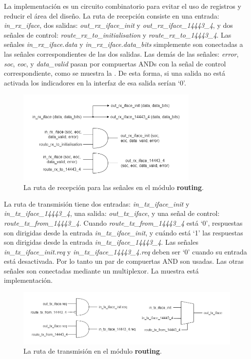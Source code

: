 \documentclass[a4paper, twoside, 11pt]{report}
\begin{document}
La implementación es un circuito combinatorio para evitar el uso de registros y reducir el área del diseño. La ruta de recepción consiste en una entrada: \textit{in\_rx\_iface}, dos salidas: \textit{out\_rx\_iface\_init} y \textit{out\_rx\_iface\_14443\_4}, y dos señales de control: \textit{route\_rx\_to\_initialisation} y \textit{route\_rx\_to\_14443\_4}. Las señales \textit{in\_rx\_iface.data} y \textit{in\_rx\_iface.data\_bits} simplemente son conectadas a las señales correspondientes de las dos salidas. Las demás de las señales: \textit{error}, \textit{soc}, \textit{eoc}, y \textit{data\_valid} pasan por compuertas ANDs con la señal de control correspondiente, como se muestra la . De esta forma, si una salida no está activada los indicadores en la interfaz de esa salida serían ‘0’.

\begin{figure}[htb]
  \centering
  \includegraphics[width=0.8\textwidth]{./img/routing_rx.drawio}
  \caption{La ruta de recepción para las señales en el módulo \textbf{routing}.}
  \label{fig:routing_rx}
\end{figure}

La ruta de transmisión tiene dos entradas: \textit{in\_tx\_iface\_init} y \textit{in\_tx\_iface\_14443\_4}, una salida: \textit{out\_tx\_iface}, y una señal de control: \textit{route\_tx\_from\_14443\_4}. Cuando \textit{route\_tx\_from\_14443\_4} está ‘0’, respuestas son dirigidas desde la entrada \textit{in\_tx\_iface\_init}, y cuándo está ‘1’ las respuestas son dirigidas desde la entrada \textit{in\_tx\_iface\_14443\_4}. Las señales \textit{in\_tx\_iface\_init.req} y \textit{in\_tx\_iface\_14443\_4.req} deben ser ‘0’ cuando su entrada está desactivada. Por lo tanto un par de compuertas AND son usadas. Las otras señales son conectadas mediante un multiplexor. La  muestra está implementación.

\begin{figure}[htb]
  \centering
  \includegraphics[width=1.0\textwidth]{./img/routing_tx.drawio}
  \caption{La ruta de transmisión en el módulo \textbf{routing}.}
  \label{fig:routing_tx}
\end{figure}
\end{document}
